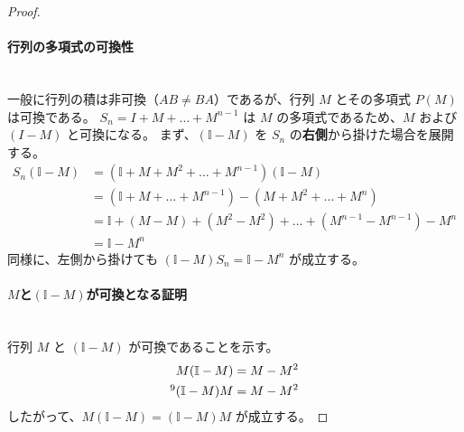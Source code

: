 \documentclass[dvipdfmx,a4paper,11pt]{jsarticle}
\begin{document}
\begin{proof}
\paragraph{行列の多項式の可換性}\ \\
一般に行列の積は非可換（$AB \neq BA$）であるが、行列 $M$ とその多項式 $P(M)$ は可換である。
$S_n = I + M + \dots + M^{n-1}$ は $M$ の多項式であるため、$M$ および $(I-M)$ と可換になる。
まず、$(\mathbb{I} - M)$ を $S_n$ の\textbf{右側}から掛けた場合を展開する。
\begin{align*}
    S_n (\mathbb{I} - M) &= (\mathbb{I} + M + M^2 + \dots + M^{n-1})(\mathbb{I} - M) \\
    &= (\mathbb{I} + M + \dots + M^{n-1}) - (M + M^2 + \dots + M^n) \\
    &= \mathbb{I} + (M - M) + (M^2 - M^2) + \dots + (M^{n-1} - M^{n-1}) - M^n \\
    &= \mathbb{I} - M^n 
\end{align*}
同様に、左側から掛けても $(\mathbb{I} - M)S_n = \mathbb{I} - M^n$ が成立する。

\paragraph{$M$と$(\mathbb{I} - M)$が可換となる証明}\ \\
行列 $M$ と $(\mathbb{I} - M)$ が可換であることを示す。
\begin{align*}
    M(\mathbb{I} - M) &= M - M^2 \\
    \footnotemark[9](\mathbb{I} - M)M &= M - M^2
\end{align*}
したがって、$M(\mathbb{I} - M) = (\mathbb{I} - M)M$ が成立する。

\end{proof}
\end{document}
